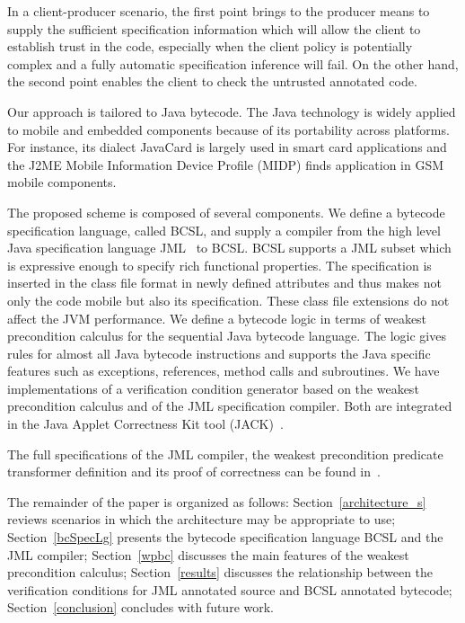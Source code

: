 In a client-producer scenario, the first point brings to the producer means to supply the sufficient specification information 
which will allow the client to establish trust in the code, especially when the client policy is potentially complex and a fully automatic specification inference
will fail. On the other hand, the second point enables the client to check the untrusted annotated code. 

  

Our approach is tailored to Java bytecode.
The Java technology is widely applied to mobile and embedded components because of its portability across platforms. 
For instance, its dialect JavaCard is largely used in smart card applications and the J2ME Mobile Information Device Profile 
(MIDP) finds application in GSM mobile components. 

The proposed scheme is composed of several components.
 We define a bytecode specification language, called BCSL, and supply a compiler from 
 the high level Java specification language JML~\cite{JMLRefMan} to BCSL. 
 BCSL supports a JML subset which is expressive enough to specify rich functional properties. 
The specification is inserted in the class file format in newly defined attributes and thus makes not
 only the code mobile but also its specification. These class
 file extensions do not affect the JVM performance.
We define a bytecode logic in terms of weakest precondition calculus for the sequential Java bytecode language. 
The logic gives rules for almost all Java bytecode instructions and supports the Java specific features such as
exceptions, references, method calls and subroutines.  
 We have implementations of a verification condition generator based on the weakest precondition calculus and of
 the JML specification compiler. Both are integrated in the Java Applet Correctness Kit tool (JACK)~\cite{BRL-JACK}.

  The full specifications of the JML compiler, the weakest precondition predicate transformer definition and its proof of correctness can be found in~\cite{JBL05MP}.
  
The remainder of the paper is organized as follows: 
Section~\ref{architecture_s} reviews scenarios in which the architecture may be appropriate to use; 
 Section~\ref{bcSpecLg} presents the bytecode specification language BCSL and the JML compiler; Section~\ref{wpbc} discusses the main
features of the weakest precondition calculus; Section~\ref{results} discusses the relationship between the verification conditions for JML annotated source and BCSL annotated bytecode; Section~\ref{conclusion} concludes with future work.  
















